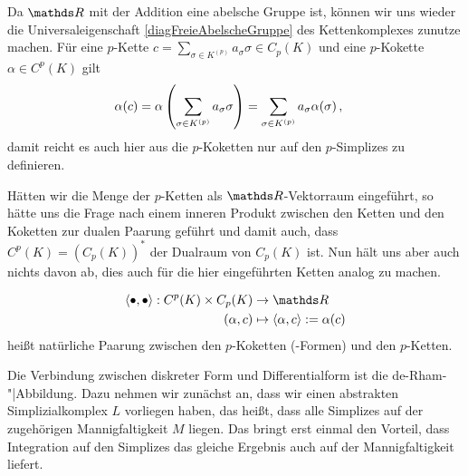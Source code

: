   \begin{folgerung}
    \label{folgUnikKoketten}
    Da \( \R \) mit der Addition eine abelsche Gruppe ist, können wir uns wieder die Universaleigenschaft \eqref{diagFreieAbelscheGruppe} des 
    Kettenkomplexes zunutze machen.
    Für eine \( p \)-Kette \( c = \sum_{\sigma\in K^{(p)}} a_{\sigma} \sigma \in C_{p}(K)\) und eine  \( p \)-Kokette \( \alpha\in C^{p}(K) \) gilt
    \begin{align}
      \alpha(c) &= \alpha\left(\sum_{\sigma\in K^{(p)}} a_{\sigma} \sigma\right) = \sum_{\sigma\in K^{(p)}} a_{\sigma} \alpha(\sigma) \,\text{,}
    \end{align}
    damit reicht es auch hier aus die \( p \)-Koketten nur auf den \( p \)-Simplizes zu definieren.
  \end{folgerung}

  Hätten wir die Menge der \( p \)-Ketten als \( \R \)-Vektorraum eingeführt, so hätte uns die Frage nach einem inneren Produkt zwischen den Ketten und den Koketten zur dualen Paarung
  geführt und damit auch, dass \( C^{p}(K) = \left( C_{p}(K) \right)^{*}\) der Dualraum von \( C_{p}(K) \) ist.
  Nun hält uns aber auch nichts davon ab, dies auch für die hier eingeführten Ketten analog zu machen.

  \begin{definition}
    \begin{align}
      \begin{aligned}
        \left\langle \bullet,\bullet \right\rangle : C^{p}(K) \times C_{p}(K)  &\rightarrow \R \\
                                                     \left( \alpha, c  \right) &\mapsto \left\langle \alpha, c \right\rangle := \alpha(c)
      \end{aligned}
    \end{align}
    heißt natürliche Paarung zwischen den \( p \)-Koketten (-Formen) und den \( p \)-Ketten.
  \end{definition}

  Die Verbindung zwischen diskreter Form und Differentialform ist die de-Rham-"|Abbildung.
  Dazu nehmen wir zunächst an, dass wir einen abstrakten Simplizialkomplex \( L \) vorliegen haben, das heißt, dass alle Simplizes auf der zugehörigen Mannigfaltigkeit \( M \) liegen.
  Das bringt erst einmal den Vorteil, dass Integration auf den Simplizes das gleiche Ergebnis auch auf der Mannigfaltigkeit liefert.

